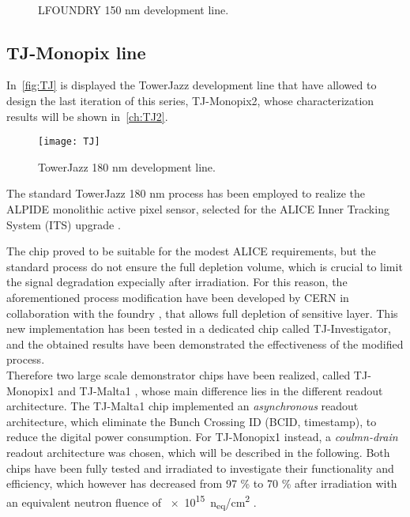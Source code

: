 \begin{figure}[h!]
\centering
\subfigure[CCPD\_LF]
{\texttt{[image: LF1]}}\quad
\subfigure[LF-CPIX]
{\texttt{[image: LF2]}}\quad
\subfigure[LF-MONOPIX 1]
{\texttt{[image: LF3]}}\\
\caption{LFOUNDRY 150 nm development line.}
\label{fig:LF}
\end{figure}


\subsection{TJ-Monopix line} \label{sec:TJ}

In~\autoref{fig:TJ} is displayed the TowerJazz development line that have allowed to design the last iteration of this series, TJ-Monopix2, whose characterization results will be shown in~\autoref{ch:TJ2}.\\

\begin{figure}[h!]
\centering
\texttt{[image: TJ]}
\caption{TowerJazz 180 nm development line.}
\label{fig:TJ}
\end{figure}

The standard TowerJazz 180 nm process has been employed to realize the ALPIDE monolithic active pixel sensor, selected for the ALICE Inner Tracking System (ITS) upgrade \cite{ALICE:2013nwm}.

The chip proved to be suitable for the modest ALICE requirements, but the standard process do not ensure the full depletion volume, which is crucial to limit the signal degradation expecially after irradiation. For this reason, the aforementioned process modification have been developed by CERN in collaboration with the foundry \cite{SNOEYS201790}, that allows full depletion of sensitive layer. This new implementation has been tested in a dedicated chip called TJ-Investigator, and the obtained results have been demonstrated the effectiveness of the modified process. \\
Therefore two large scale demonstrator chips have been realized, called TJ-Monopix1 and TJ-Malta1 \cite{Moustakas:2017qqw}, whose main difference lies in the different readout architecture. The TJ-Malta1 chip implemented an \textit{asynchronous} readout architecture, which eliminate the Bunch Crossing ID (BCID, timestamp), to reduce the digital power consumption. For TJ-Monopix1 instead, a \textit{coulmn-drain} readout architecture was chosen, which will be described in the following. Both chips have been fully tested and irradiated to investigate their functionality and efficiency, which however has decreased from 97 \% to 70 \% after irradiation with an equivalent neutron fluence of \SI{e15}{n_{eq}/cm^{2}} \cite{Caicedo:2019lrk}. 

